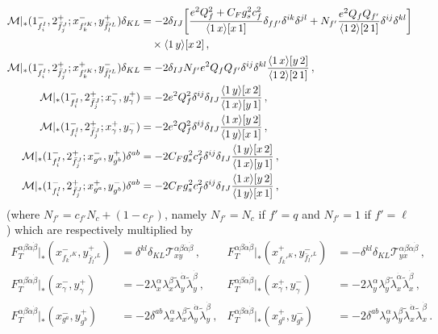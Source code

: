 \begin{align}
    \mathcal M|_{*} (1_{f_i^I}^{-},2_{\bar f_j^J}^{+}; x_{f_k'^K}^{-},y_{\bar f_l'^L}^{+})\delta_{KL} &= 
    -2\delta_{IJ}\bigg[\frac{e^2Q_f^2+C_Fg_s^2c_f^2}{\langle1\, x \rangle\lbrack x\, 1 \rbrack}\delta_{ff'}\delta^{ik}\delta^{jl} + N_{f'}\frac{e^2Q_f Q_{f'}}{\langle1\, 2 \rangle\lbrack 2\, 1 \rbrack} \delta^{ij}\delta^{kl}\bigg]\nonumber \\&\quad\times \langle1\, y \rangle\lbrack x\, 2 \rbrack
    \,, \\
    \mathcal M|_{*} (1_{f_i^I}^{-},2_{\bar f_j^J}^{+}; x_{f_k'^K}^{+},y_{\bar f_l'^L}^{-})\delta_{KL} &= 
    -2\delta_{IJ} N_{f'}e^2Q_f Q_{f'}\delta^{ij}\delta^{kl} \frac{ \langle1\, x \rangle\lbrack y\, 2 \rbrack}{\langle1\, 2 \rangle\lbrack 2\, 1 \rbrack}\,,  \\
    \mathcal M|_*(1^-_{f_i^I},2^+_{\bar f_j^J};x^-_\gamma,y^+_\gamma) &= -2e^2Q_f^2\delta^{ij}\delta_{IJ}\frac{\langle1\, y \rangle\lbrack x\, 2 \rbrack}{\langle1\, x \rangle\lbrack y\, 1 \rbrack}\,, \\
    \mathcal M|_*(1^-_{f_i^I},2^+_{\bar f_j^J};x^+_\gamma,y^-_\gamma) &= -2e^2Q_f^2\delta^{ij}\delta_{IJ}\frac{\langle1\, x \rangle\lbrack y\, 2 \rbrack}{\langle1\, y \rangle\lbrack x\, 1 \rbrack}\,,\\
    \mathcal M|_*(1^-_{f_i^I},2^+_{\bar f_j^J};x^-_{g^a},y^+_{g^b})\delta^{ab} &= -2C_Fg_s^2c_f^2\delta^{ij}\delta_{IJ}\frac{\langle1\, y \rangle\lbrack x\, 2 \rbrack}{\langle1\, x \rangle\lbrack y\, 1 \rbrack}\,, \\
    \mathcal M|_*(1^-_{f_i^I},2^+_{\bar f_j^J};x^+_{g^a},y^-_{g^b})\delta^{ab} &= -2C_Fg_s^2c_f^2\delta^{ij}\delta_{IJ}\frac{\langle1\, x \rangle\lbrack y\, 2 \rbrack}{\langle1\, y \rangle\lbrack x\, 1 \rbrack}\,,
\end{align}
(where $N_{f'}=c_{f'}N_c + (1 - c_{f'})$, namely $N_{f'}=N_c$ if $f'=q$ and $N_{f'}=1$ if $f'=\ell$) which are respectively multiplied by
\begin{align}
    F_T^{\alpha\beta\dot\alpha\dot\beta}|_{*}(x_{f_k'^K}^{-},y_{\bar f_l'^L}^{+}) &= \delta^{kl}\delta_{KL}\mathcal T^{\alpha\beta\dot\alpha\dot\beta}_{xy} \,,&
    F_T^{\alpha\beta\dot\alpha\dot\beta}|_{*}(x_{f_k'^K}^{+},y_{\bar f_l'^L}^{-}) &= -\delta^{kl}\delta_{KL}\mathcal T^{\alpha\beta\dot\alpha\dot\beta}_{yx}\,,\\
    F_T^{\alpha\beta\dot\alpha\dot\beta}|_{*}(x_{\gamma}^{-},y_{\gamma}^{+}) &= -2\lambda_x^\alpha \lambda_x^\beta \tilde\lambda_y^{\dot\alpha} \tilde\lambda_y^{\dot\beta}\,, &
    F_T^{\alpha\beta\dot\alpha\dot\beta}|_{*}(x_{\gamma}^{+},y_{\gamma}^{-}) &= -2\lambda_y^\alpha \lambda_y^\beta \tilde\lambda_x^{\dot\alpha} \tilde\lambda_x^{\dot\beta}\,, \\
    F_T^{\alpha\beta\dot\alpha\dot\beta}|_{*}(x_{g^a}^{-},y_{g^b}^{+}) &= -2\delta^{ab}\lambda_x^\alpha \lambda_x^\beta \tilde\lambda_y^{\dot\alpha} \tilde\lambda_y^{\dot\beta}\,, &
    F_T^{\alpha\beta\dot\alpha\dot\beta}|_{*}(x_{g^a}^{+},y_{g^b}^{-}) &= -2\delta^{ab}\lambda_y^\alpha \lambda_y^\beta \tilde\lambda_x^{\dot\alpha} \tilde\lambda_x^{\dot\beta}
    \,.
\end{align}

